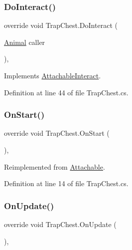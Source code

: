 \subsubsection{\texorpdfstring{Do\+Interact()}{DoInteract()}}
{\footnotesize\ttfamily override void Trap\+Chest.\+Do\+Interact (\begin{DoxyParamCaption}\item[{\mbox{\hyperlink{class_animal}{Animal}}}]{caller }\end{DoxyParamCaption})\hspace{0.3cm}{\ttfamily [protected]}, {\ttfamily [virtual]}}



Implements \mbox{\hyperlink{class_attachable_interact_a9b07a54f1dbb96777c4bd287dfe438e3}{Attachable\+Interact}}.



Definition at line 44 of file Trap\+Chest.\+cs.

\mbox{\label{class_trap_chest_a4579ba0a67f7426ffeea20df606c9ea7}} 
\subsubsection{\texorpdfstring{On\+Start()}{OnStart()}}
{\footnotesize\ttfamily override void Trap\+Chest.\+On\+Start (\begin{DoxyParamCaption}{ }\end{DoxyParamCaption})\hspace{0.3cm}{\ttfamily [protected]}, {\ttfamily [virtual]}}



Reimplemented from \mbox{\hyperlink{class_attachable_a3c05c0b07b831881a7ab245057d34d30}{Attachable}}.



Definition at line 14 of file Trap\+Chest.\+cs.

\mbox{\label{class_trap_chest_a8e86df57796079618494f48e727cc782}} 
\subsubsection{\texorpdfstring{On\+Update()}{OnUpdate()}}
{\footnotesize\ttfamily override void Trap\+Chest.\+On\+Update (\begin{DoxyParamCaption}{ }\end{DoxyParamCaption})\hspace{0.3cm}{\ttfamily [protected]}, {\ttfamily [virtual]}}



